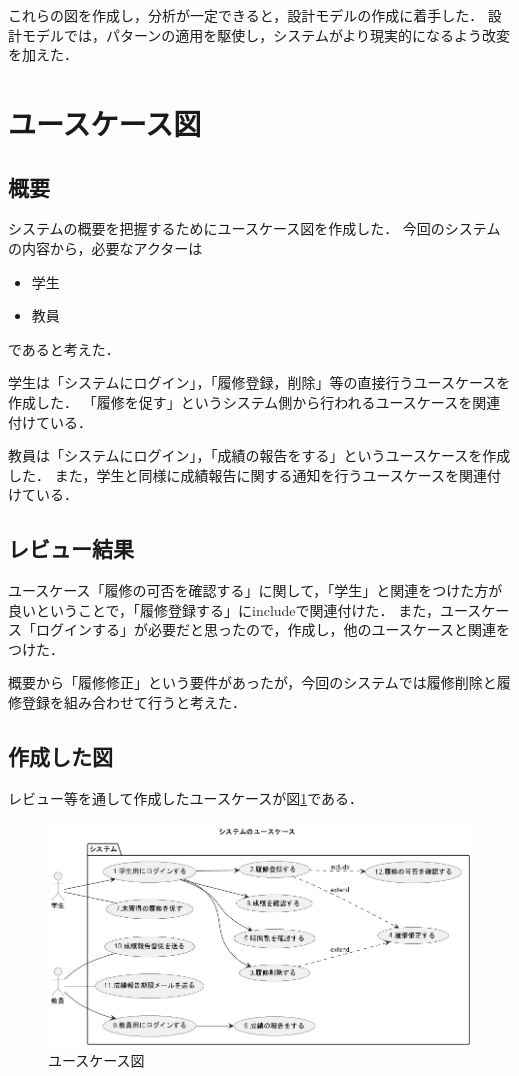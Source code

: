 \documentclass[documentclass]{jsarticle}
\begin{document}
これらの図を作成し，分析が一定できると，設計モデルの作成に着手した．
設計モデルでは，パターンの適用を駆使し，システムがより現実的になるよう改変を加えた．


\newpage

\section{ユースケース図}
\subsection*{概要}
システムの概要を把握するためにユースケース図を作成した．
今回のシステムの内容から，必要なアクターは
\begin{itemize}
  \item 学生
  \item 教員
\end{itemize}
であると考えた．

学生は「システムにログイン」，「履修登録，削除」等の直接行うユースケースを作成した．
「履修を促す」というシステム側から行われるユースケースを関連付けている．

教員は「システムにログイン」，「成績の報告をする」というユースケースを作成した．
また，学生と同様に成績報告に関する通知を行うユースケースを関連付けている．

\subsection*{レビュー結果}
ユースケース「履修の可否を確認する」に関して，「学生」と関連をつけた方が良いということで，「履修登録する」にincludeで関連付けた．
また，ユースケース「ログインする」が必要だと思ったので，作成し，他のユースケースと関連をつけた．

概要から「履修修正」という要件があったが，今回のシステムでは履修削除と履修登録を組み合わせて行うと考えた．

\subsection*{作成した図}
レビュー等を通して作成したユースケースが図\ref*{fig:3-1}である．
\begin{figure}[H]
  \begin{center}
    \includegraphics*[scale=0.5]{figure/3-1.png}
  \end{center}
  \caption{ユースケース図}
  \label{fig:3-1}
\end{figure}
\end{document}
